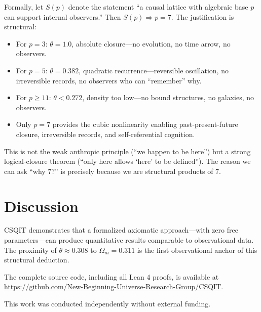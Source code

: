 \documentclass[aps,prl,twocolumn,nofootinbib,floatfix]{revtex4-2}
\begin{document}
Formally, let $S(p)$ denote the statement ``a causal lattice with algebraic base $p$ can support internal observers.'' Then $S(p) \Rightarrow p = 7$. The justification is structural:
\begin{itemize}
    \item For $p=3$: $\theta=1.0$, absolute closure---no evolution, no time arrow, no observers.
    \item For $p=5$: $\theta=0.382$, quadratic recurrence---reversible oscillation, no irreversible records, no observers who can ``remember'' why.
    \item For $p \ge 11$: $\theta < 0.272$, density too low---no bound structures, no galaxies, no observers.
    \item Only $p=7$ provides the cubic nonlinearity enabling past-present-future closure, irreversible records, and self-referential cognition.
\end{itemize}

This is not the weak anthropic principle (``we happen to be here'') but a strong logical-closure theorem (``only here allows `here' to be defined''). The reason we can ask ``why 7?'' is precisely because we are structural products of 7.

\section{Discussion}

CSQIT demonstrates that a formalized axiomatic approach---with zero free parameters---can produce quantitative results comparable to observational data. The proximity of $\theta \approx 0.308$ to $\Omega_m = 0.311$ is the first observational anchor of this structural deduction.

The complete source code, including all Lean 4 proofs, is available at \url{https://github.com/New-Beginning-Universe-Research-Group/CSQIT}.

\acknowledgments

This work was conducted independently without external funding.


\end{document}
